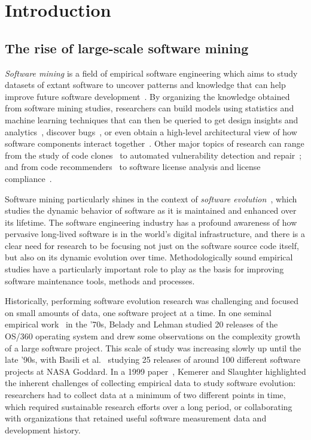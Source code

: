 \chapter{Introduction}%
\label{chp:introduction}

\section{The rise of large-scale software mining}

\emph{Software mining} is a field of empirical software engineering which aims
to study datasets of extant software to uncover patterns and knowledge that can
help improve future software development~\cite{2006-zeller-msr}. By organizing
the knowledge obtained from software mining studies, researchers can build
models using statistics and machine learning techniques that can then be
queried to get design insights and analytics~\cite{hassan2006mining}, discover
bugs~\cite{williams2005automatic,BugRepair2017}, or even obtain a high-level
architectural view of how software components interact
together~\cite{hassan2008road}.
Other major topics of research can range from the study of code
clones~\cite{SvajlenkoR17, SemuraYCI17, ThummalapentaCAP10,
rattan2013clonedetectionreview} to automated vulnerability detection and
repair~\cite{Li2017, Grieco2016, MartinezM15}; and from code
recommenders~\cite{Zeller2007, ZimmermannWDZ04} to software license analysis
and license compliance~\cite{GermanLicense17, VendomeLicence2015}.

Software mining particularly shines in the context of \emph{software
evolution}~\cite{mens2008swevolintro,kagdi2007msrsurvey}, which studies the
dynamic behavior of software as it is maintained and enhanced over its
lifetime. The software engineering industry has a profound awareness of how
pervasive long-lived software is in the world's digital infrastructure, and
there is a clear need for research to be focusing not just on the software
source code itself, but also on its dynamic evolution over time.
Methodologically sound empirical studies have a particularly important role to
play as the basis for improving software maintenance tools, methods and
processes.

Historically, performing software evolution research was challenging and
focused on small amounts of data, one software project at a time. In one
seminal empirical work~\cite{belady1976model} in the '70s, Belady and Lehman
studied 20 releases of the OS/360 operating system and drew some observations
on the complexity growth of a large software project. This scale of study was
increasing slowly up until the late '90s, with Basili et
al.~\cite{basili1996understanding} studying 25 releases of around 100 different
software projects at NASA Goddard.  In a 1999
paper~\cite{kemerer1999empirical}, Kemerer and Slaughter highlighted the
inherent challenges of collecting empirical data to study software evolution:
researchers had to collect data at a minimum of two different points in time,
which required sustainable research efforts over a long period, or
collaborating with organizations that retained useful software measurement data
and development history.

